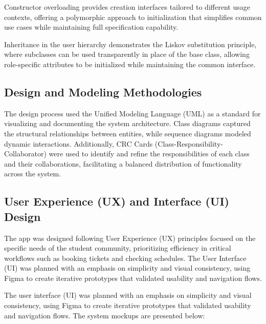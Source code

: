 \documentclass[12pt]{article}
\begin{document}
Constructor overloading provides creation interfaces tailored to different usage contexts, offering a polymorphic approach to initialization that simplifies common use cases while maintaining full specification capability.

Inheritance in the user hierarchy demonstrates the Liskov substitution principle, where subclasses can be used transparently in place of the base class, allowing role-specific attributes to be initialized while maintaining the common interface.

\subsection{Design and Modeling Methodologies}
The design process used the Unified Modeling Language (UML) as a standard for visualizing and documenting the system architecture. Class diagrams captured the structural relationships between entities, while sequence diagrams modeled dynamic interactions. Additionally, CRC Cards (Class-Responsibility-Collaborator) were used to identify and refine the responsibilities of each class and their collaborations, facilitating a balanced distribution of functionality across the system.

\subsection{User Experience (UX) and Interface (UI) Design}
The app was designed following User Experience (UX) principles focused on the specific needs of the student community, prioritizing efficiency in critical workflows such as booking tickets and checking schedules. The User Interface (UI) was planned with an emphasis on simplicity and visual consistency, using Figma to create iterative prototypes that validated usability and navigation flows.

The user interface (UI) was planned with an emphasis on simplicity and visual consistency, using Figma to create iterative prototypes that validated usability and navigation flows. The system mockups are presented below:
\end{document}
